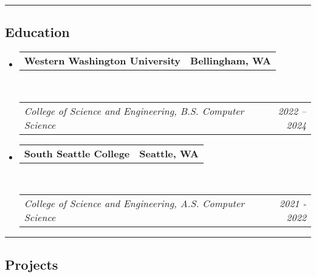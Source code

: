\documentclass[10pt,letterpaper]{article}
\makeatletter
\newcommand{\headerrow}[2]
{\begin{tabular*}{\linewidth}{l@{\extracolsep{\fill}}r}
	#1 &
	#2 \\
\end{tabular*}}
\makeatother
\begin{document}
\hrule
\vspace{-0.4em}
\subsection*{Education}

\begin{itemize}
    \parskip=0.1em

    \item
          \headerrow
          {\textbf{Western Washington University}}
          {\textbf{Bellingham, WA}}
          \\
          \headerrow
          {\emph{College of Science and Engineering, B.S. Computer Science}}
          {\emph{2022 -- 2024}}
    \item
          \headerrow
          {\textbf{South Seattle College}}
          {\textbf{Seattle, WA}}
          \\
          \headerrow
          {\emph{College of Science and Engineering, A.S. Computer Science}}
          {\emph{2021 - 2022}}
\end{itemize}


\hrule
\vspace{-0.4em}
\subsection*{Projects}
\end{document}
